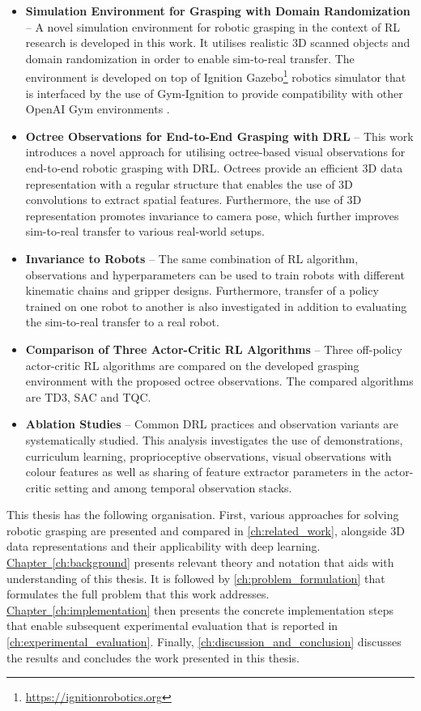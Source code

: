 \begin{itemize}
    \item \textbf{Simulation Environment for Grasping with Domain Randomization} -- A novel simulation environment for robotic grasping in the context of RL research is developed in this work. It utilises realistic 3D scanned objects and domain randomization in order to enable sim-to-real transfer. The environment is developed on top of Ignition Gazebo\footnote{\href{https://ignitionrobotics.org}{https://ignitionrobotics.org}} robotics simulator that is interfaced by the use of Gym-Ignition \cite{ferigo_gym-ignition_2020} to provide compatibility with other OpenAI Gym environments \cite{brockman_openai_2016}.
    \item \textbf{Octree Observations for End-to-End Grasping with DRL} -- This work introduces a novel approach for utilising octree-based visual observations for end-to-end robotic grasping with DRL. Octrees provide an efficient 3D data representation with a regular structure that enables the use of 3D convolutions to extract spatial features. Furthermore, the use of 3D representation promotes invariance to camera pose, which further improves sim-to-real transfer to various real-world setups.
    \item \textbf{Invariance to Robots} -- The same combination of RL algorithm, observations and hyperparameters can be used to train robots with different kinematic chains and gripper designs. Furthermore, transfer of a policy trained on one robot to another is also investigated in addition to evaluating the sim-to-real transfer to a real robot.
    \item \textbf{Comparison of Three Actor-Critic RL Algorithms} -- Three off-policy actor-critic RL algorithms are compared on the developed grasping environment with the proposed octree observations. The compared algorithms are TD3, SAC and TQC.
    \item \textbf{Ablation Studies} -- Common DRL practices and observation variants are systematically studied. This analysis investigates the use of demonstrations, curriculum learning, proprioceptive observations, visual observations with colour features as well as sharing of feature extractor parameters in the actor-critic setting and among temporal observation stacks.
\end{itemize}

This thesis has the following organisation. First, various approaches for solving robotic grasping are presented and compared in \autoref{ch:related_work}, alongside 3D data representations and their applicability with deep learning. \hyperref[ch:background]{Chapter~\ref*{ch:background}} presents relevant theory and notation that aids with understanding of this thesis. It is followed by \autoref{ch:problem_formulation} that formulates the full problem that this work addresses. \hyperref[ch:implementation]{Chapter~\ref*{ch:implementation}} then presents the concrete implementation steps that enable subsequent experimental evaluation that is reported in \autoref{ch:experimental_evaluation}. Finally, \autoref{ch:discussion_and_conclusion} discusses the results and concludes the work presented in this thesis.
